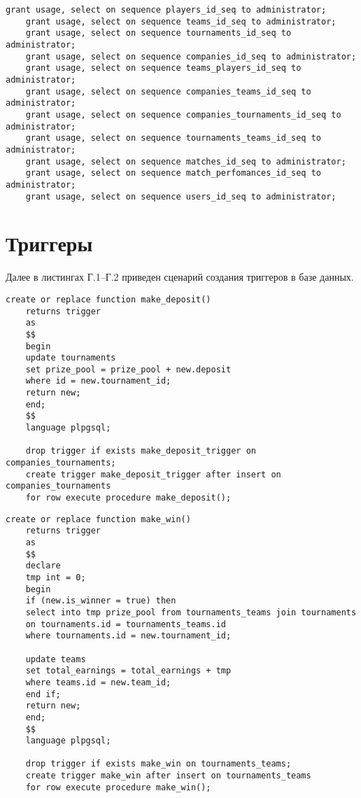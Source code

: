 \begin{appendices}
\begin{lstlisting}[caption={Сценарий создания ролевой модели в базе данных (часть 3)}]
	grant usage, select on sequence players_id_seq to administrator;
	grant usage, select on sequence teams_id_seq to administrator;
	grant usage, select on sequence tournaments_id_seq to administrator;
	grant usage, select on sequence companies_id_seq to administrator;
	grant usage, select on sequence teams_players_id_seq to administrator;
	grant usage, select on sequence companies_teams_id_seq to administrator;
	grant usage, select on sequence companies_tournaments_id_seq to administrator;
	grant usage, select on sequence tournaments_teams_id_seq to administrator;
	grant usage, select on sequence matches_id_seq to administrator;
	grant usage, select on sequence match_perfomances_id_seq to administrator;
	grant usage, select on sequence users_id_seq to administrator;
\end{lstlisting}

	\chapter{Триггеры}

Далее в листингах Г.1--Г.2 приведен сценарий создания триггеров в базе данных.

\begin{lstlisting}[caption={Сценарий создания триггеров в базе данных (часть 1)}]
	create or replace function make_deposit()
	returns trigger
	as
	$$
	begin
	update tournaments
	set prize_pool = prize_pool + new.deposit 
	where id = new.tournament_id;
	return new;
	end;
	$$ 
	language plpgsql;
	
	drop trigger if exists make_deposit_trigger on companies_tournaments;
	create trigger make_deposit_trigger after insert on companies_tournaments
	for row execute procedure make_deposit();
\end{lstlisting}

\clearpage

\begin{lstlisting}[caption={Сценарий создания триггеров в базе данных (часть 2)}]
	create or replace function make_win()
	returns trigger
	as
	$$
	declare
	tmp int = 0;
	begin
	if (new.is_winner = true) then 
	select into tmp prize_pool from tournaments_teams join tournaments
	on tournaments.id = tournaments_teams.id
	where tournaments.id = new.tournament_id;
	
	update teams
	set total_earnings = total_earnings + tmp
	where teams.id = new.team_id;
	end if;
	return new;
	end;
	$$ 
	language plpgsql;
	
	drop trigger if exists make_win on tournaments_teams;
	create trigger make_win after insert on tournaments_teams
	for row execute procedure make_win();
\end{lstlisting}

\clearpage


\end{appendices}